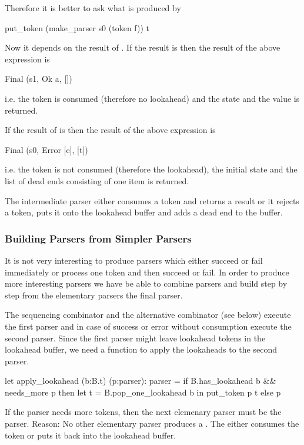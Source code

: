 Therefore it is better to ask what is produced by
\begin{ocaml}
  put_token (make_parser s0 (token f)) t
\end{ocaml}
Now it depends on the result of . If the result is  then the result of the above expression is
%
\begin{ocaml}
  Final (s1, Ok a, [])
\end{ocaml}
%
i.e. the token is consumed (therefore no lookahead) and the state 
and the value  is returned.

If the result of  is  then the result of the above
expression is
%
\begin{ocaml}
  Final (s0, Error [e], [t])
\end{ocaml}
%
i.e. the token is not consumed (therefore the lookahead), the initial state
and the list of dead ends consisting of one item is returned.

The intermediate parser  either consumes a token and returns a
result or it rejects a token, puts it onto the lookahead buffer and adds a
dead end to the buffer.

\subsubsection{Building Parsers from Simpler Parsers}

It is not very interesting to produce parsers which either succeed or fail
immediately or process one token and then succeed or fail. In order to produce
more interesting parsers we have be able to combine parsers and build step by
step from the elementary parsers the final parser.

The sequencing combinator \code{>>=} and the alternative combinator \code{<|>}
(see below) execute the first parser and in case of success or error without
consumption execute the second parser. Since the first parser might leave
lookahead tokens in the lookahead buffer, we need a function to apply the
lookaheads to the second parser.

\begin{ocaml}
  let apply_lookahead (b:B.t) (p:parser): parser =
    if B.has_lookahead b && needs_more p  then
      let t = B.pop_one_lookahead b in
      put_token p t
    else
      p
\end{ocaml}
%
If the parser needs more tokens, then the next elemenary parser must be the
 parser. Reason: No other elementary parser produces a . The  either consumes the token or puts it back into
the lookahead buffer.

